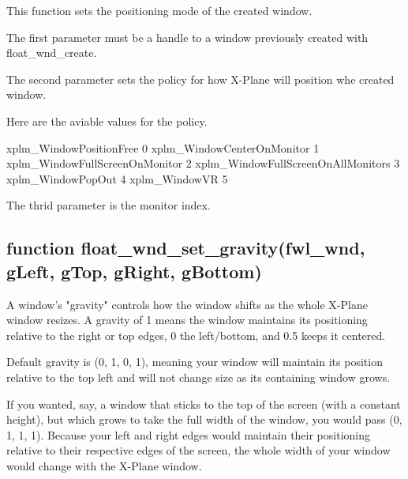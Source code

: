 \documentclass[11pt,parskip=half,a4paper]{scrartcl}
\begin{document}
This function sets the positioning mode of the created window.

The first parameter must be a handle to a window previously created with float\_wnd\_create.

The second parameter sets the policy for how X-Plane will position whe created window.

\hspace*{10mm}	Here are the aviable values for the policy.

\hspace*{10mm}	xplm\_WindowPositionFree \hspace*{23.0mm}	0\newline
\hspace*{10mm}	xplm\_WindowCenterOnMonitor \hspace*{15.0mm}	1\newline
\hspace*{10mm}	xplm\_WindowFullScreenOnMonitor \hspace*{8.5mm}	2\newline
\hspace*{10mm}	xplm\_WindowFullScreenOnAllMonitors \hspace*{2.5mm}	3\newline
\hspace*{10mm}	xplm\_WindowPopOut \hspace*{31.2mm}	4\newline
\hspace*{10mm}	xplm\_WindowVR \hspace*{38.0mm}	5

The thrid parameter is the monitor index.

\subsection{\hspace*{1.0mm}function float\_wnd\_set\_gravity(fwl\_wnd, gLeft, gTop, gRight, gBottom)}

A window's "gravity" controls how the window shifts as the whole X-Plane window resizes. A gravity of 1 means the window maintains its positioning relative to the right or top edges, 0 the left/bottom, and 0.5 keeps it centered.

Default gravity is (0, 1, 0, 1), meaning your window will maintain its position relative to the top left and will not change size as its containing window grows.

If you wanted, say, a window that sticks to the top of the screen (with a constant height), but which grows to take the full width of the window, you would pass (0, 1, 1, 1). Because your left and right edges would maintain their positioning relative to their respective edges of the screen, the whole width of your window would change with the X-Plane window.
\end{document}
